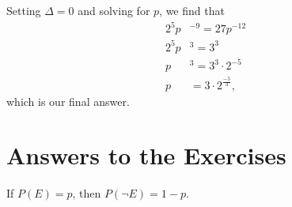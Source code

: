 \documentclass{book}
\begin{document}
Setting $\Delta = 0$ and solving for $p$, we find that
\begin{align*}
2^5p&^{-9} = 27p^{-12}\\
2^5p&^3 = 3^3\\
p&^3 = 3^3\cdot 2^{-5}\\
p& = 3\cdot 2^{\frac{-5}{3}},
\end{align*}
which is our final answer.
\allowdisplaybreaks

\appendix

\chapter{Answers to the Exercises}\label{answers}

\renewcommand{\thechapter}{\arabic{chapter}}

\begin{answer}
If $P(E) = p$, then $P(\neg E) = 1 - p$.
\end{answer}









\end{document}
